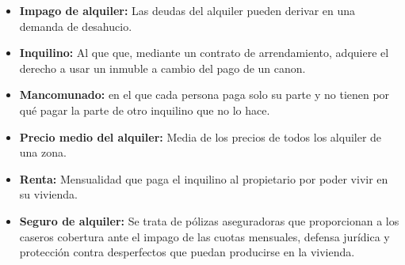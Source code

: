 \begin{itemize}
\item \textbf{Impago de alquiler:} Las deudas del alquiler pueden derivar en una demanda de desahucio.

\item \textbf{Inquilino:} Al que que, mediante un contrato de arrendamiento, adquiere el derecho a usar un inmuble a cambio del pago de un canon.

\item \textbf{Mancomunado:} en el que cada persona paga solo su parte y no tienen por qué pagar la parte de otro inquilino que no lo hace. 

\item \textbf{Precio medio del alquiler:} Media de los precios de todos los alquiler de una zona.

\item \textbf{Renta:} Mensualidad que paga el inquilino al propietario por poder vivir en su vivienda.

\item \textbf{Seguro de alquiler:} Se trata de pólizas aseguradoras que proporcionan a los caseros cobertura ante el impago de las cuotas mensuales, defensa jurídica y protección contra desperfectos que puedan producirse en la vivienda.


\end{itemize}